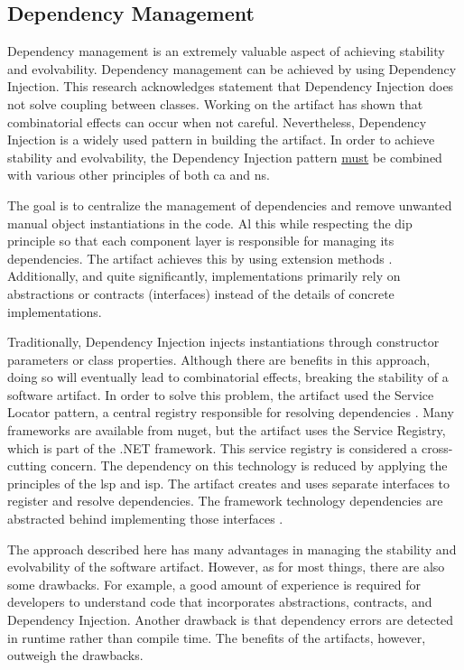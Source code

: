 \subsection{Dependency Management}

Dependency management is an extremely valuable aspect of achieving stability and
evolvability. Dependency management can be achieved by using Dependency Injection. This
research acknowledges \textcite[215]{mannaert_normalized_2016} statement that Dependency
Injection does not solve coupling between classes. Working on the artifact has shown that
combinatorial effects can occur when not careful. Nevertheless, Dependency Injection is a
widely used pattern in building the artifact. In order to achieve stability and
evolvability, the Dependency Injection pattern \underline{must} be combined with various
other principles of both \gls{ca} and \gls{ns}. 

The goal is to centralize the management of dependencies and remove unwanted manual object
instantiations in the code. Al this while respecting the \gls{dip} principle so that each
component layer is responsible for managing its dependencies. The artifact achieves this
by using extension methods \parencite{koks_dependencyinjectionextension_2023}. Additionally, and quite significantly,
implementations primarily rely on abstractions or contracts (interfaces) instead of the
details of concrete implementations. 

Traditionally, Dependency Injection injects instantiations through constructor parameters
or class properties. Although there are benefits in this approach, doing so will
eventually lead to combinatorial effects, breaking the stability of a software artifact.
In order to solve this problem, the artifact used the Service Locator pattern, a central
registry responsible for resolving dependencies \parencite{wikipedia_service_2023}. Many
frameworks are available from \gls{nuget}, but the artifact uses the Service Registry,
which is part of the .NET framework. This service registry is considered a cross-cutting
concern. The dependency on this technology is reduced by applying the principles of the
\gls{lsp} and \gls{isp}. The artifact creates and uses separate interfaces to register
\parencite{koks_idependencymanagerinteractor_2023} and resolve
\parencite{koks_idependencyfactoryinteractor_2023} dependencies. The framework technology
dependencies are abstracted behind implementing those interfaces
\parencite{koks_dependencymanagerinteractor_2023}. 

The approach described here has many advantages in managing the stability and evolvability
of the software artifact. However, as for most things, there are also some drawbacks. For
example, a good amount of experience is required for developers to understand code that
incorporates abstractions, contracts, and Dependency Injection. Another drawback is that
dependency errors are detected in runtime rather than compile time. The benefits of the
artifacts, however, outweigh the drawbacks.